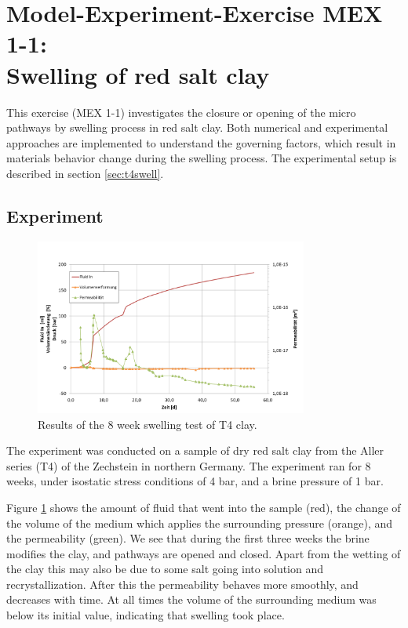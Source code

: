 \section{Model-Experiment-Exercise MEX 1-1:\\Swelling of red salt clay}
\label{sec:mex05}
This exercise (MEX 1-1) investigates the closure or opening of the micro pathways by swelling process in red salt clay. Both numerical and experimental approaches are implemented to understand the governing factors, which result in materials behavior change during the swelling process. The experimental setup is described in section \ref{sec:t4swell}.

\subsection{Experiment}

\begin{figure}[ht]
\centering
\includegraphics[width=0.8\textwidth]{figures/IfG-T4-results.png}
\caption{Results of the 8 week swelling test of T4 clay.}
\label{fig:t4swellresults}
\end{figure}

The experiment was conducted on a sample of dry red salt clay from the Aller series (T4) of the Zechstein in northern Germany. The experiment ran for 8 weeks, under isostatic stress conditions of 4 bar, and a brine pressure of 1 bar. 

Figure \ref{fig:t4swellresults} shows the amount of fluid that went into the sample (red), the change of the volume of the medium which applies the surrounding pressure (orange), and the permeability (green). We see that during the first three weeks the brine modifies the clay, and pathways are opened and closed. Apart from the wetting of the clay this may also be due to some salt going into solution and recrystallization. After this the permeability behaves more smoothly, and decreases with time. At all times the volume of the surrounding medium was below its initial value, indicating that swelling took place. 

